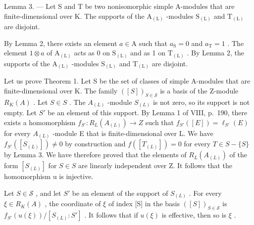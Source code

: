 Lemma 3. --- Let S and T be two nonisomorphic simple A-modules that are finite-dimensional over K. The supports of the \(\mathrm{A}_{(\mathrm{L})}\) -modules \(\mathrm{S}_{(\mathrm{L})}\) and \(\mathrm{T}_{(\mathrm{L})}\) are disjoint.

By Lemma 2, there exists an element \(a \in \mathrm{A}\) such that \(a_{\mathrm{S}} = 0\) and \(a_{\mathrm{T}} = 1\) . The element \(1 \otimes a\) of \(\mathrm{A}_{(\mathrm{L})}\) acts as 0 on \(\mathrm{S}_{(\mathrm{L})}\) and as 1 on \(\mathrm{T}_{(\mathrm{L})}\) . By Lemma 2, the supports of the \(\mathrm{A}_{(\mathrm{L})}\) -modules \(\mathrm{S}_{(\mathrm{L})}\) and \(\mathrm{T}_{(\mathrm{L})}\) are disjoint.

Let us prove Theorem 1. Let S be the set of classes of simple A-modules that are finite-dimensional over K. The family \(([S])_{S \in \mathcal{S}}\) is a basis of the Z-module \(R_{K}(A)\) . Let \(S \in S\) . The \(A_{(L)}\) -module \(S_{(L)}\) is not zero, so its support is not empty. Let \(S'\) be an element of this support. By Lemma 1 of VIII, p.~190, there exists a homomorphism \(f_{S'} : R_L(A_{(L)}) \to Z\) such that \(f_{S'}([E]) = \ell_{S'}(E)\) for every \(A_{(L)}\) -module E that is finite-dimensional over L. We have \(f_{S'}([S_{(L)}]) \neq 0\) by construction and \(f([T_{(L)}]) = 0\) for every \(T \in S - \{S\}\) by Lemma 3. We have therefore proved that the elements of \(R_L(A_{(L)})\) of the form \([S_{(L)}]\) for \(S \in S\) are linearly independent over Z. It follows that the homomorphism u is injective.

Let \(S \in \mathscr{S}\) , and let \(S'\) be an element of the support of \(S_{(L)}\) . For every \(\xi \in R_K(A)\) , the coordinate of \(\xi\) of index {[}S{]} in the basis \(([S])_{S \in \mathscr{S}}\) is \(f_{S'}(u(\xi)) / [S_{(L)} : S']\) . It follows that if \(u(\xi)\) is effective, then so is \(\xi\) .


